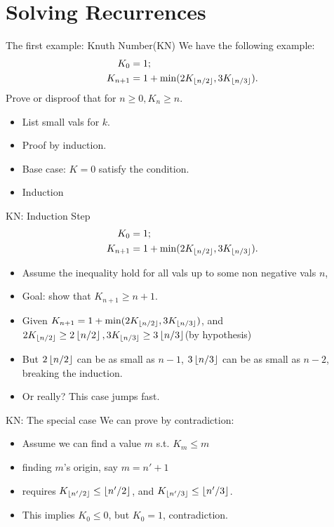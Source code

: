 \section{Solving Recurrences}

\begin{frame}{The first example: Knuth Number(KN)}
We have the following example: 
\begin{align*}
    K_0 &= 1; \\
    K_{n+1} &= 1+ \min (2K_{\left \lfloor n/2 \right\rfloor}, 3K_{\left \lfloor n/3 \right\rfloor}).\\
\end{align*}
Prove or disproof that for $n \geq 0, K_n \geq n$. 

\begin{itemize}
    \item List small vals for $k$. 
    \item Proof by induction.
    \item Base case: $K=0$ satisfy the condition.
    \item Induction
\end{itemize}
    
\end{frame}

\begin{frame}{KN: Induction Step}
\begin{align*}
    K_0 &= 1; \\
    K_{n+1} &= 1+ \min (2K_{\left \lfloor n/2 \right\rfloor}, 3K_{\left \lfloor n/3 \right\rfloor}).\\
\end{align*}

\begin{itemize}
    \item Assume the inequality hold for all vals up to some 
    non negative vals $n$, 
    \item Goal: show that $K_{n+1} \geq n+1$. 
    \item Given $K_{n+1}=1+\min(2K_{\left \lfloor n/2 \right\rfloor}, 3K_{\left \lfloor n/3 \right\rfloor})$, 
    and $2K_{\left \lfloor n/2 \right\rfloor} \geq 2 \left \lfloor n/2 \right\rfloor, 3K_{\left \lfloor n/3 \right\rfloor}\geq 3\left \lfloor n/3 \right\rfloor$(by hypothesis) 
    \item But $2 \left \lfloor n/2 \right\rfloor $ can be as small as $n-1$, $3\left \lfloor n/3 \right\rfloor$ 
    can be as small as $n-2$, breaking the induction. 
    \item Or really? This case jumps fast.
\end{itemize}
    
\end{frame}

\begin{frame}{KN: The special case}
We can prove by contradiction: 
\begin{itemize}
    \item Assume we can find a value $m$ s.t. $K_m \leq m$
    \item finding $m$'s origin, say $m=n'+1$
    \item requires $K_{\left \lfloor n'/2 \right\rfloor}\leq \left \lfloor n'/2 \right\rfloor$, and $K_{\left \lfloor n'/3 \right\rfloor}\leq \left \lfloor n'/3 \right\rfloor$. 
    \item This implies $K_0 \leq 0$, but $K_0 = 1$, contradiction. 
\end{itemize}
    
\end{frame}

